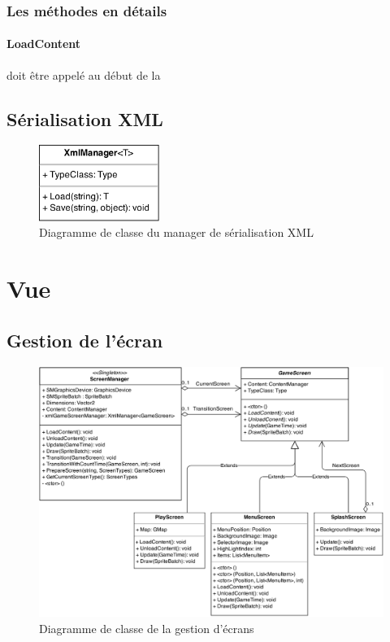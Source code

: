 \documentclass[11pt, a4paper, oneside]{report}
\begin{document}
\subsubsection{Les méthodes en détails}
\paragraph{LoadContent} doit être appelé au début de la 
\subsection{Sérialisation XML}
\begin{figure}[H]
	\begin{center}
	\includegraphics[width=0.35\textwidth]{XmlManager}
	\caption{Diagramme de classe du manager de sérialisation XML}
	\label{fig:XmlManager}
	\end{center}
\end{figure}

\section{Vue}
\subsection{Gestion de l'écran}
\begin{figure}[H]
	\begin{center}
	\includegraphics[width=1\textwidth]{screenmanagement}
	\caption{Diagramme de classe de la gestion d'écrans}
	\label{fig:screenmanagement}
	\end{center}
\end{figure}
\end{document}
